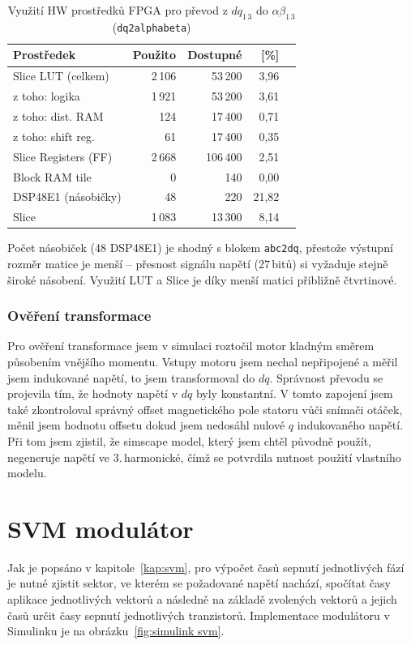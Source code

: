 \begin{table}[h]
\centering

\begin{tabular}{lrrrr}
\toprule
\textbf{Prostředek} & \textbf{Použito} & \textbf{Dostupné} & \textbf{[\%]} \\
\midrule
Slice LUT (celkem)       & 2\,106 & 53\,200  & 3{,}96 \\
\quad z toho: logika     & 1\,921 & 53\,200  & 3{,}61 \\
\quad z toho: dist. RAM  &   124  & 17\,400  & 0{,}71 \\
\quad z toho: shift reg. &    61  & 17\,400  & 0{,}35 \\
Slice Registers (FF)     & 2\,668 & 106\,400 & 2{,}51 \\
Block RAM tile           &     0  &    140   & 0{,}00 \\
DSP48E1 (násobičky)      &    48  &    220   & 21{,}82 \\
Slice                    & 1\,083 & 13\,300  & 8{,}14 \\
\bottomrule
\end{tabular}
\caption{Využití HW prostředků FPGA pro převod z $dq_{1\,3}$ do $\alpha \beta _{1\,3}$  (\texttt{dq2alphabeta})}
\label{tab:hw_hdlKrinv}
\end{table}

Počet násobiček (48 DSP48E1) je shodný s blokem \texttt{abc2dq}, přestože výstupní rozměr matice je menší -- přesnost signálu napětí (27\,bitů) si vyžaduje stejně široké násobení. Využití LUT a Slice je díky menší matici přibližně čtvrtinové.

\subsubsection{Ověření transformace}
Pro ověření transformace jsem v simulaci roztočil motor kladným směrem působením vnějšího momentu. Vstupy motoru jsem nechal nepřipojené a měřil jsem indukované napětí, to jsem transformoval do $dq$. Správnost převodu se projevila tím, že hodnoty napětí v $dq$ byly konstantní. V tomto zapojení jsem také zkontroloval správný offset magnetického pole statoru vůči snímači otáček, měnil jsem hodnotu offsetu dokud jsem nedosáhl nulové $q$ indukovaného napětí. Při tom jsem zjistil, že simscape model, který jsem chtěl původně použít, negeneruje napětí ve 3.\,harmonické, čímž se potvrdila nutnost použití vlastního modelu.


\section{SVM modulátor}
Jak je popsáno v kapitole~\ref{kap:svm}, pro výpočet časů sepnutí jednotlivých fází je nutné zjistit sektor, ve kterém se požadované napětí nachází, spočítat časy aplikace jednotlivých vektorů a následně na základě zvolených vektorů a jejich časů určit časy sepnutí jednotlivých tranzistorů. Implementace modulátoru v Simulinku je na obrázku~\ref{fig:simulink svm}.

